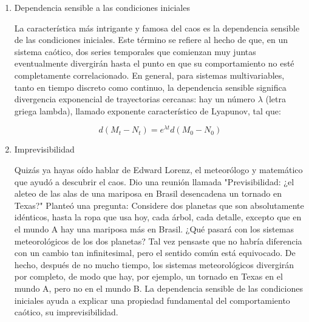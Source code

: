 \documentclass[11pt, letterpaper, spanish]{article}
\begin{document}
{\begin{enumerate}
 
    A primera vista, parece que las poblaciones oscilan, aunque de una manera algo compleja. Sin embargo, una mirada más cercana revela diferencias. La segunda gran oscilación contiene una protuberancia antes del pico, mientras que la tercera oscilación tiene al menos dos. Además, cada pico tiene una forma algo diferente. Esto es aperiodicidad. A pesar de una similitud cualitativa general, el comportamiento del sistema nunca se repite y nunca se acerca a la repetición. Una afirmación similar es cierta acerca de la salida del modelo logístico de tiempo discreto. Puede parecer que algunas formas se repiten, pero si miramos de cerca, vemos que la secuencia, de hecho, nunca se repite. \cite{garfinkel_shevtsov_guo_2017}
    
    \item{Dependencia sensible a las condiciones iniciales}
    \par{La característica más intrigante y famosa del caos es la dependencia sensible de las condiciones iniciales. Este término se refiere al hecho de que, en un sistema caótico, dos series temporales que comienzan muy juntas eventualmente divergirán hasta el punto en que su comportamiento no esté completamente correlacionado. En general, para sistemas multivariables, tanto en tiempo discreto como continuo, la dependencia sensible significa divergencia exponencial de trayectorias cercanas: hay un número $\lambda$ (letra griega lambda), llamado exponente característico de Lyapunov, tal que:} 
    
    \begin{equation*}
    d ( M_{t} − N_{t} ) = e^{ \lambda t} d ( M_{0} − N_{0} )  
    \end{equation*}

    \vspace{0,5 cm}

    \item{Imprevisibilidad}
    
    Quizás ya hayas oído hablar de Edward Lorenz, el meteorólogo y matemático que ayudó a descubrir el caos. Dio una reunión llamada "Previsibilidad: ¿el aleteo de las alas de una mariposa en Brasil desencadena un tornado en Texas?" Planteó una pregunta: Considere dos planetas que son absolutamente idénticos, hasta la ropa que usa hoy, cada árbol, cada detalle, excepto que en el mundo A hay una mariposa más en Brasil. ¿Qué pasará con los sistemas meteorológicos de los dos planetas? Tal vez pensaste que no habría diferencia con un cambio tan infinitesimal, pero el sentido común está equivocado. De hecho, después de no mucho tiempo, los sistemas meteorológicos divergirán por completo, de modo que hay, por ejemplo, un tornado en Texas en el mundo A, pero no en el mundo B. 
    La dependencia sensible de las condiciones iniciales ayuda a explicar una propiedad fundamental del comportamiento caótico, su imprevisibilidad. \cite{garfinkel_shevtsov_guo_2017}
    \end{enumerate}



}
\end{document}
